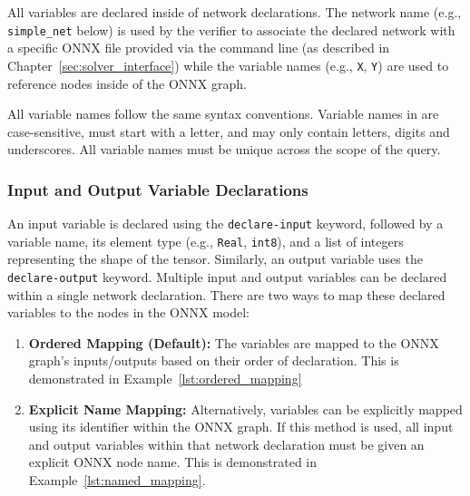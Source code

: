 All variables are declared inside of network declarations.  The network name (e.g., \texttt{simple\_net} below) is used by the verifier to 
associate the declared network with a specific ONNX file provided via the command line (as described in Chapter~\ref{sec:solver_interface}) while the variable names 
(e.g., \texttt{X}, \texttt{Y}) are used to reference nodes inside of the ONNX graph. 

All variable names follow the same syntax conventions. Variable names in \vnnlib{} are case-sensitive, must start with a letter, and may only contain letters, digits and underscores. All variable names must
be unique across the scope of the \vnnlib{} query. 


\subsubsection*{Input and Output Variable Declarations}
\label{sec:input-output-declarations}
An input variable is declared using the \texttt{declare-input} keyword, followed by a variable name, its element type (e.g., \texttt{Real}, \texttt{int8}), 
and a list of integers representing the shape of the tensor. Similarly, an output variable uses the \texttt{declare-output} keyword. Multiple 
input and output variables can be declared within a single network declaration. There are two ways to map these declared variables to the nodes in the ONNX model:
\begin{enumerate}
    \item \textbf{Ordered Mapping (Default):} The variables are mapped to the ONNX graph's inputs/outputs based on their order of declaration. This is demonstrated in Example~\ref{lst:ordered_mapping}
    \item \textbf{Explicit Name Mapping:} Alternatively, variables can be explicitly mapped using its identifier within the ONNX graph. If this method is used, all input and output 
        variables within that network declaration must be given an explicit ONNX node name. This is demonstrated in Example~\ref{lst:named_mapping}.
\end{enumerate}

